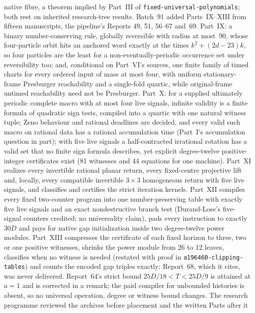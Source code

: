 \documentclass[11pt]{article}
\newcommand{\dir}[1]{\texttt{#1}}
\begin{document}
{native fibre, a theorem implied by Part~III of
\dir{fixed-universal-polynomials}; both rest on inherited research-tree
results.  Batch~91 added Parts~IX--XIII from fifteen manuscripts, the
pipeline's Reports 49, 51, 56--67 and~69.  Part~IX: a binary number-conserving rule,
globally reversible with radius at most~90, whose four-particle orbit hits
an anchored word exactly at the times $k^2+(2d-23)k$, so four particles are
the least for a non-eventually-periodic occurrence set under reversibility
too; and, conditional on Part~VI's sources, one finite family of timed
charts for every ordered input of mass at most four, with uniform
stationary-frame Presburger reachability and a single-fold quartic, while
original-frame untimed reachability need not be Presburger.  Part~X: for a
supplied ultimately periodic complete macro with at most four live
signals, infinite validity is a finite formula of quadratic sign tests,
compiled into a quartic with one natural witness tuple; Zeno behaviour and
rational deadlines are decided, and every valid such macro on rational
data has a rational accumulation time (Part~I's accumulation question in
part); with five live signals a half-contracted irrational rotation has a
valid set that no finite sign formula describes, yet explicit
degree-twelve positive-integer certificates exist (81 witnesses and 44
equations for one machine).  Part~XI realizes every invertible rational
planar return, every fixed-centre projective lift and, locally, every
compatible invertible $3\times3$ homogeneous return with five live
signals, and classifies and certifies the strict iteration kernels.
Part~XII compiles every fixed two-counter program into one
number-preserving table with exactly five live signals and an exact
nondestructive branch test (Durand-Lose's five-signal counters credited;
no universality claim), pads every instruction to exactly $30D$ and pays
for native gap initialization inside two degree-twelve power modules.
Part~XIII compresses the certificate of each fixed horizon to three, two
or one positive witnesses, shrinks the power module from 26 to 12 leaves,
classifies when no witness is needed (restated with proof in
\dir{a196460-clipping-tables}) and counts the encoded gap triples exactly;
Report~68, which it cites, was never delivered.  Report~64's strict bound
$25D/18<T<25D/9$ is attained at $a=1$ and is corrected in a remark; the
paid compiler for unbounded histories is absent, so no universal operation,
degree or witness bound changes.  The research programme reviewed the
archives before placement and the written Parts after it
}
\end{document}
